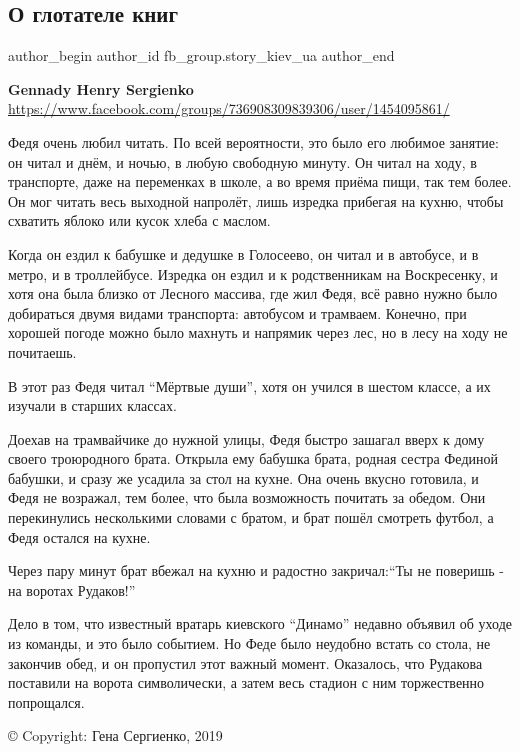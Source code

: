  
 
 
 
 
 
\subsection{О глотателе книг}
\label{sec:23_05_2021.fb.fb_group.story_kiev_ua.1.glotatel_knig}
\ifcmt
 author_begin
   author_id fb_group.story_kiev_ua
 author_end
\fi

\textbf{Gennady Henry Sergienko}
\url{https://www.facebook.com/groups/736908309839306/user/1454095861/}

Федя очень любил читать. По всей вероятности, это было его любимое занятие: он
читал и днём, и ночью, в любую свободную минуту. Он читал на ходу, в
транспорте, даже на переменках в школе, а во время приёма пищи, так тем более.
Он мог читать весь выходной напролёт, лишь изредка прибегая на кухню, чтобы
схватить яблоко или кусок хлеба с маслом.

Когда он ездил к бабушке и дедушке в Голосеево, он читал и в автобусе, и в
метро, и в троллейбусе. Изредка он ездил и к родственникам на Воскресенку, и
хотя она была близко от Лесного массива, где жил Федя, всё равно нужно было
добираться двумя видами транспорта: автобусом и трамваем. Конечно, при хорошей
погоде можно было махнуть и напрямик через лес, но в лесу на ходу не почитаешь.

В этот раз Федя читал \enquote{Мёртвые души}, хотя он учился в шестом классе, а их изучали в старших классах.

Доехав на трамвайчике до нужной улицы, Федя быстро зашагал вверх к дому своего
троюродного брата. Открыла ему бабушка брата, родная сестра Фединой бабушки, и
сразу же усадила за стол на кухне. Она очень вкусно готовила, и Федя не
возражал, тем более, что была возможность почитать за обедом. Они перекинулись
несколькими словами с братом, и брат пошёл смотреть футбол, а Федя остался на
кухне.

Через пару минут брат вбежал на кухню и радостно закричал:\enquote{Ты не поверишь - на воротах Рудаков!}

Дело в том, что известный вратарь киевского \enquote{Динамо} недавно объявил об уходе
из команды, и это было событием. Но Феде было неудобно встать со стола, не
закончив обед, и он пропустил этот важный момент. Оказалось, что Рудакова
поставили на ворота символически, а затем весь стадион с ним торжественно
попрощался.

© Copyright: Гена Сергиенко, 2019
